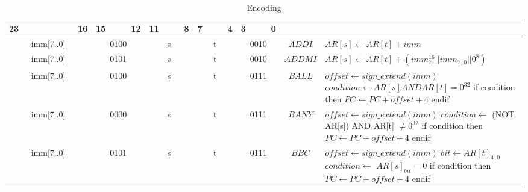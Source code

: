 \setlength{\tabcolsep}{4pt}
\renewcommand{\arraystretch}{2}
	\begin{longtable}{llllllllllllllllllllllll  p{1cm}  p{7cm} | }
		\caption{Encoding\label{long}}\\
		23 & & & & & & & 16 & 15 & & & 12 & 11 & & & 8 & 7 & & & 4 & 3 & & & 0 & & \multicolumn{1}{c}{}\\
		\hline
        \endhead
		\multicolumn{8}{|c|}{imm[7..0]} & \multicolumn{4}{c|}{0100} & \multicolumn{4}{c|}{s} & \multicolumn{4}{c|}{t} & \multicolumn{4}{c|}{0010} & \multicolumn{1}{c|}{$ADDI$} & $AR[s] \leftarrow AR[t] + imm$ \\ \hline
		\multicolumn{8}{|c|}{imm[7..0]} & \multicolumn{4}{c|}{0101} & \multicolumn{4}{c|}{s} & \multicolumn{4}{c|}{t} & \multicolumn{4}{c|}{0010} & \multicolumn{1}{c|}{$ADDMI$} & $AR[s] \leftarrow AR[t] + (imm_7^{16} || imm_{7..0} || 0^8)$ \\ \hline
		\multicolumn{8}{|c|}{imm[7..0]} & \multicolumn{4}{c|}{0100} & \multicolumn{4}{c|}{s} & \multicolumn{4}{c|}{t} & \multicolumn{4}{c|}{0111} & \multicolumn{1}{c|}{$BALL$} & $offset \leftarrow sign\_extend(imm)$ \newline $condition \leftarrow AR[s] AND AR[t] = 0^{32}$ \newline if condition then \newline $PC \leftarrow PC + offset + 4$ \newline endif\\ \hline
		\multicolumn{8}{|c|}{imm[7..0]} & \multicolumn{4}{c|}{0000} & \multicolumn{4}{c|}{s} & \multicolumn{4}{c|}{t} & \multicolumn{4}{c|}{0111} & \multicolumn{1}{c|}{$BANY$} & $offset \leftarrow sign\_extend(imm)$ \newline  $condition \leftarrow$ (NOT AR[s]) AND AR[t] $\neq 0^{32}$ \newline if condition then \newline $PC \leftarrow PC + offset + 4$ \newline endif\\ \hline
		\multicolumn{8}{|c|}{imm[7..0]} & \multicolumn{4}{c|}{0101} & \multicolumn{4}{c|}{s} & \multicolumn{4}{c|}{t} & \multicolumn{4}{c|}{0111} & \multicolumn{1}{c|}{$BBC$} & $offset \leftarrow sign\_extend(imm)$ \newline $bit \leftarrow AR[t]_{4..0}$ \newline $condition \leftarrow$ $AR[s]_{bit} = 0$ \newline if condition then \newline $PC \leftarrow PC + offset + 4$ \newline endif\\ \hline

\end{longtable}
